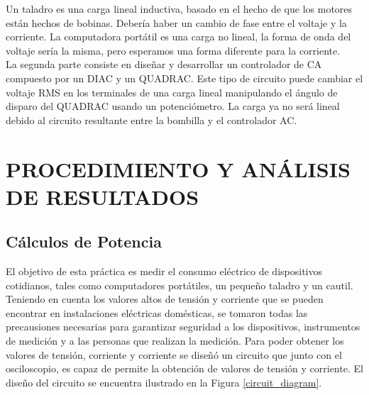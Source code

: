 \documentclass[journal]{IEEEtran}
\begin{document}
Un taladro es una carga lineal inductiva, basado 
en el hecho de que los motores están hechos de 
bobinas. Debería haber un cambio de fase entre el 
voltaje y la corriente. La computadora portátil 
es una carga no lineal, la forma de onda del voltaje 
sería la misma, pero esperamos una forma diferente 
para la corriente. \\

La segunda parte consiste en diseñar y desarrollar 
un controlador de CA compuesto por un DIAC y un 
QUADRAC. Este tipo de circuito puede cambiar el 
voltaje RMS en los terminales de una carga lineal 
manipulando el ángulo de disparo del QUADRAC usando 
un potenciómetro. La carga ya no será lineal debido 
al circuito resultante entre la bombilla y el 
controlador AC.



\section{PROCEDIMIENTO Y ANÁLISIS DE RESULTADOS}

\subsection{Cálculos de Potencia}

El objetivo de esta práctica es medir el consumo eléctrico 
de dispositivos cotidianos, tales como computadores 
portátiles, un pequeño taladro y un cautil. Teniendo en 
cuenta los valores altos de tensión y corriente que se 
pueden encontrar en instalaciones eléctricas domésticas, se
tomaron todas las precausiones necesarias para garantizar 
seguridad a los dispositivos, instrumentos de medición y 
a las personas que realizan la medición. Para poder 
obtener los valores de tensión, corriente y corriente se 
diseñó un circuito que junto con el osciloscopio, es capaz de
permite la obtención de valores de tensión y corriente. El 
diseño del circuito se encuentra ilustrado en la Figura 
\ref{circuit_diagram}. \\

\end{document}
